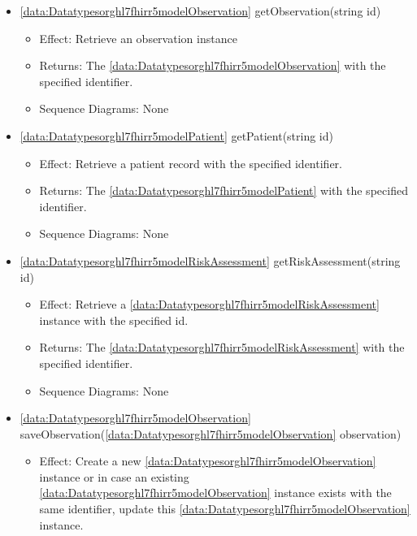 \begin{description}
\begin{itemize}[noitemsep,nolistsep,leftmargin=-.25cm]
\begin{itemize}[noitemsep,nolistsep]
           \item Effect: Delete a \ref{data:Datatypesorghl7fhirr5modelRiskAssessment} instance with the specified id. 
           \item Sequence Diagrams: None
        \end{itemize}
      \item \textsf{\ref{data:Datatypesorghl7fhirr5modelObservation} getObservation(string id)}
        \begin{itemize}[noitemsep,nolistsep]
           \item Effect: Retrieve an observation instance 
           \item Returns: The \ref{data:Datatypesorghl7fhirr5modelObservation} with the specified identifier.
           \item Sequence Diagrams: None
        \end{itemize}
      \item \textsf{\ref{data:Datatypesorghl7fhirr5modelPatient} getPatient(string id)}
        \begin{itemize}[noitemsep,nolistsep]
           \item Effect: Retrieve a patient record with the specified identifier. 
           \item Returns: The \ref{data:Datatypesorghl7fhirr5modelPatient} with the specified identifier.
           \item Sequence Diagrams: None
        \end{itemize}
      \item \textsf{\ref{data:Datatypesorghl7fhirr5modelRiskAssessment} getRiskAssessment(string id)}
        \begin{itemize}[noitemsep,nolistsep]
           \item Effect: Retrieve a \ref{data:Datatypesorghl7fhirr5modelRiskAssessment} instance with the specified id. 
           \item Returns: The \ref{data:Datatypesorghl7fhirr5modelRiskAssessment} with the specified identifier.
           \item Sequence Diagrams: None
        \end{itemize}
      \item \textsf{\ref{data:Datatypesorghl7fhirr5modelObservation} saveObservation(\ref{data:Datatypesorghl7fhirr5modelObservation} observation)}
        \begin{itemize}[noitemsep,nolistsep]
           \item Effect: Create a new \ref{data:Datatypesorghl7fhirr5modelObservation} instance or in case an existing \ref{data:Datatypesorghl7fhirr5modelObservation} instance exists with the same identifier, update this \ref{data:Datatypesorghl7fhirr5modelObservation} instance. 

\end{itemize}
\end{itemize}
\end{description}
